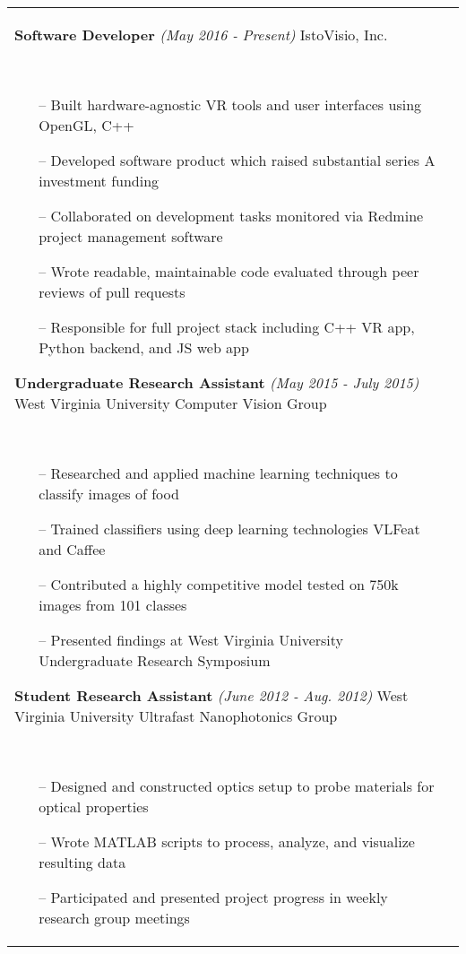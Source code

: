 \documentclass{article}
\begin{document}
\begin{tabular}{@{}p{2.5cm}@{\hspace{0.2cm}}p{13cm}@{}}
\textbf{Software Developer}
\hfill\small\textit{(May 2016 - Present)}\normalsize
\newline IstoVisio, Inc.
\par\,\small
\begin{itemize}[leftmargin=*,nolistsep,noitemsep]
  \item[--]Built hardware-agnostic VR tools and user interfaces using OpenGL, C++
  \item[--]Developed software product which raised substantial series A investment funding
	\item[--]Collaborated on development tasks monitored via Redmine project management software
	\item[--]Wrote readable, maintainable code evaluated through peer reviews of pull requests
	\item[--]Responsible for full project stack including C++ VR app, Python backend, and JS web app
\newline
\end{itemize}
\normalsize

\textbf{Undergraduate Research Assistant}
\hfill\small\textit{(May 2015 - July 2015)}\normalsize
\newline West Virginia University Computer Vision Group
\par\,\small
\begin{itemize}[leftmargin=*,nolistsep,noitemsep]
  \item[--]Researched and applied machine learning techniques to classify images of food
  \item[--]Trained classifiers using deep learning technologies VLFeat and Caffee
  \item[--]Contributed a highly competitive model tested on 750k images from 101 classes
	\item[--]Presented findings at West Virginia University Undergraduate Research Symposium
\newline
\end{itemize}
\normalsize

\textbf{Student Research Assistant}
\hfill\small\textit{(June 2012 - Aug. 2012)}\normalsize
\newline West Virginia University Ultrafast Nanophotonics Group
\par\,\small
\begin{itemize}[leftmargin=*, nolistsep,noitemsep]
  \item[--]Designed and constructed optics setup to probe materials for optical properties
  \item[--]Wrote MATLAB scripts to process, analyze, and visualize resulting data
	\item[--]Participated and presented project progress in weekly research group meetings
\end{itemize}
\normalsize \\


\end{tabular}
\end{document}
